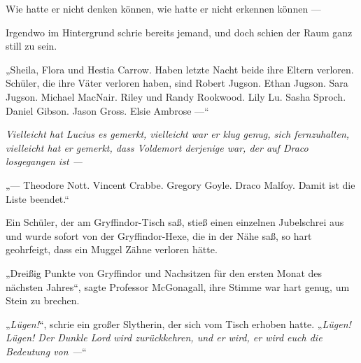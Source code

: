 Wie hatte er nicht denken können, wie hatte er nicht erkennen können —

Irgendwo im Hintergrund schrie bereits jemand, und doch schien der Raum ganz still zu sein.

„Sheila, Flora und Hestia Carrow. Haben letzte Nacht beide ihre Eltern verloren. Schüler, die ihre Väter verloren haben, sind Robert Jugson. Ethan Jugson. Sara Jugson. Michael MacNair. Riley und Randy Rookwood. Lily Lu. Sasha Sproch. Daniel Gibson. Jason Gross. Elsie Ambrose —“

\emph{Vielleicht hat Lucius es gemerkt, vielleicht war er klug genug, sich fernzuhalten, vielleicht hat er gemerkt, dass Voldemort derjenige war, der auf Draco losgegangen ist —}

„— Theodore Nott. Vincent Crabbe. Gregory Goyle. Draco Malfoy. Damit ist die Liste beendet.“

Ein Schüler, der am Gryffindor-Tisch saß, stieß einen einzelnen Jubelschrei aus und wurde sofort von der Gryffindor-Hexe, die in der Nähe saß, so hart geohrfeigt, dass ein Muggel Zähne verloren hätte.

„Dreißig Punkte von Gryffindor und Nachsitzen für den ersten Monat des nächsten Jahres“, sagte Professor McGonagall, ihre Stimme war hart genug, um Stein zu brechen.

„\emph{Lügen!}“, schrie ein großer Slytherin, der sich vom Tisch erhoben hatte.
„\emph{Lügen! Lügen! Der Dunkle Lord wird zurückkehren, und er wird, er wird euch die Bedeutung von —}“

